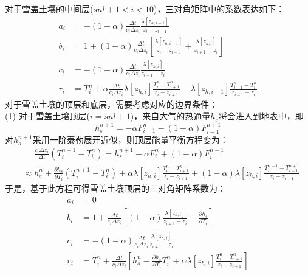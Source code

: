 对于雪盖土壤的中间层($snl+1<i<10$)，三对角矩阵中的系数表达如下：
\begin{equation}
\begin{aligned}
a_{i} &= -(1-\alpha) \frac{\Delta t}{c_{i} \Delta z_{i}} \frac{\lambda\left[z_{h, i-1}\right]}{z_{i}-z_{i-1}} \\ 
b_{i} &= 1+(1-\alpha) \frac{\Delta t}{c_{i} \Delta z_{i}}\left[\frac{\lambda\left[z_{h, i-1}\right]}{z_{i}-z_{i-1}}+\frac{\lambda\left[z_{h, i}\right]}{z_{i+1}-z_{i}}\right] \\ 
c_{i} &= -(1-\alpha) \frac{\Delta t}{c_{i} \Delta z_{i}} \frac{\lambda\left[z_{h, i}\right]}{z_{i+1}-z_{i}} \\
r_{i} &= T_{i}^{n}+\alpha \frac{\Delta t}{c_{i} \Delta z_{i}} \lambda\left[z_{h, i}\right] \frac{T_{i}^{n}-T_{i+1}^{n}}{z_{i}-z_{i+1}}-\lambda\left[z_{h, i-1}\right] \frac{T_{i-1}^{n}-T_{i}^{n}}{z_{i-1}-z_{i}}
\end{aligned}
\end{equation}
对于雪盖土壤的顶层和底层，需要考虑对应的边界条件：\\
(1) 对于雪盖土壤顶层($i=snl+1$)，来自大气的热通量$h_s$将会进入到地表中，即
\begin{equation}
h_{s}^{n+1}=-\alpha F_{i-1}^{n}-(1-\alpha) F_{i-1}^{n+1}
\end{equation}
对$h_s^{n+1}$采用一阶泰勒展开近似，则顶层能量平衡方程变为：
\begin{equation}
\begin{split}
&\mathrel{\phantom{\approx}}\frac{c_{i} \Delta z_{i}}{\Delta t}\left(T_{i}^{n+1}-T_{i}^{n}\right)=h_{s}^{n+1}+\alpha F_{i}^{n}+(1-\alpha) F_{i}^{n+1} \\ 
&\approx h_{s}^{n}+\frac{\partial h_{s}}{\partial T_{i}}\left(T_{i}^{n+1}-T_{i}^{n}\right)+\alpha \lambda\left[z_{h, i}\right] \frac{T_{i}^{n}-T_{i+1}^{n}}{z_{i}-z_{i+1}}+(1-\alpha) \lambda\left[z_{h, i}\right] \frac{T_{i}^{n+1}-T_{i+1}^{n+1}}{z_{i}-z_{i+1}}
\end{split}
\end{equation}
于是，基于此方程可得雪盖土壤顶层的三对角矩阵系数为：
\begin{equation}
\begin{aligned}
a_{i} &= 0 \\ 
b_{i} &= 1+\frac{\Delta t}{c_{i} \Delta z_{i}}\left[(1-\alpha) \frac{\lambda\left[z_{h, i}\right]}{z_{i+1}-z_{i}}-\frac{\partial h_{s}}{\partial T_{i}}\right] \\
c_{i} &= -(1-\alpha) \frac{\Delta t}{c_{i} \Delta z_{i}} \frac{\lambda\left[z_{h, i}\right]}{z_{i+1}-z_{i}} \\
r_{i} &= T_{i}^{n}+\frac{\Delta t}{c_{i} \Delta z_{i}}\left[h_{s}^{n}-\frac{\partial h_{s}}{\partial T_{i}} T_{i}^{n}+\alpha \lambda\left[z_{h, i}\right] \frac{T_{i}^{n}-T_{i+1}^{n}}{z_{i}-z_{i+1}}\right]
\end{aligned}
\end{equation}
